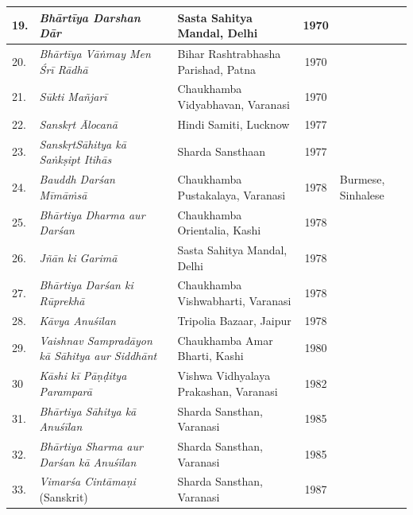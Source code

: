 \begin{longtable}{|l|p{2.9cm}|p{1.8cm}|c|p{1.6cm}|}
\hline
19. & \textit{Bhārtīya Darshan Dār} & Sasta Sahitya Mandal, Delhi & 1970 &   \\
\hline
20. & \textit{Bhārtīya Vāṅmay Men Śrī Rādhā} & Bihar Rashtrabhasha Parishad, Patna & 1970 &   \\
\hline
21. & \textit{Sūkti Mañjarī} & Chaukhamba Vidyabhavan, Varanasi & 1970 &   \\
\hline
22. & \textit{Sanskṛt Ālocanā} & Hindi Samiti, Lucknow & 1977 &   \\
\hline
23. & \textit{SanskṛtSāhitya kā Saṅkṣipt Itihās} & Sharda Sansthaan & 1977 &   \\
\hline
24. & \textit{Bauddh Darśan Mīmāṁsā} & Chaukhamba Pustakalaya, Varanasi & 1978 & Burmese, Sinhalese \\
\hline
25. & \textit{Bhārtiya Dharma aur Darśan} & Chaukhamba Orientalia, Kashi & 1978 &   \\
\hline
26. & \textit{Jñān ki Garimā} & Sasta Sahitya Mandal, Delhi & 1978 &   \\
\hline
27. & \textit{Bhārtiya Darśan ki Rūprekhā} & Chaukhamba Vishwabharti, Varanasi & 1978 &   \\
\hline
28. & \textit{Kāvya Anuśīlan} & Tripolia Bazaar, Jaipur & 1978 &   \\
\hline
29. & \textit{Vaishnav Sampradāyon kā Sāhitya aur Siddhānt} & Chaukhamba Amar Bharti, Kashi & 1980 &   \\
\hline
30 & \textit{Kāshi kī Pāṇḍitya Paramparā} & Vishwa Vidhyalaya Prakashan, Varanasi & 1982 &   \\
\hline
31. & \textit{Bhārtiya Sāhitya kā Anuśīlan} & Sharda Sansthan, Varanasi & 1985 &   \\
\hline
32. & \textit{Bhārtiya Sharma aur Darśan kā Anuśīlan} & Sharda Sansthan, Varanasi & 1985 &   \\
\hline
33. & \textit{Vimarśa Cintāmaṇi} (Sanskrit) & Sharda Sansthan, Varanasi & 1987 &   \\
\hline
\end{longtable}

\theendnotes

\label{chapter7-end}
